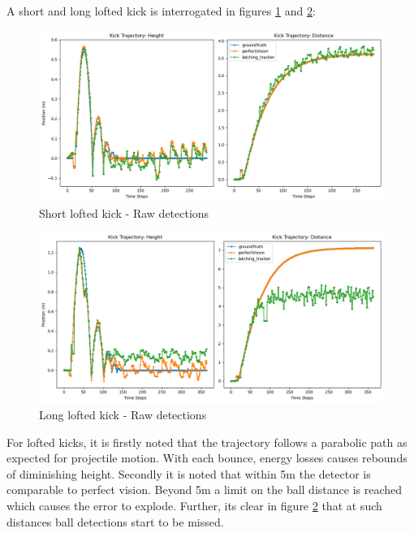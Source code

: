 \documentclass[a4paper,twoside,12pt]{report}
\begin{document}
A short and long lofted kick is interrogated in figures \ref{fig:rawloftshort} and \ref{fig:rawloftlong}:

\begin{figure}[h!]
\begin{center}
\includegraphics[width=12cm]{images/raw_loft_short.png}
\caption{Short lofted kick - Raw detections}
\label{fig:rawloftshort}
\end{center}
\end{figure}

\begin{figure}[h!]
\begin{center}
\includegraphics[width=12cm]{images/raw_loft_long.png}
\caption{Long lofted kick - Raw detections}
\label{fig:rawloftlong}
\end{center}
\end{figure}

For lofted kicks, it is firstly noted that the trajectory follows a parabolic path as expected for projectile motion. With each bounce, energy losses causes rebounds of diminishing height. Secondly it is noted that within 5m the detector is comparable to perfect vision. Beyond 5m a limit on the ball distance is reached which causes the error to explode. Further, its clear in figure \ref{fig:rawloftlong} that at such distances ball detections start to be missed.
\end{document}
